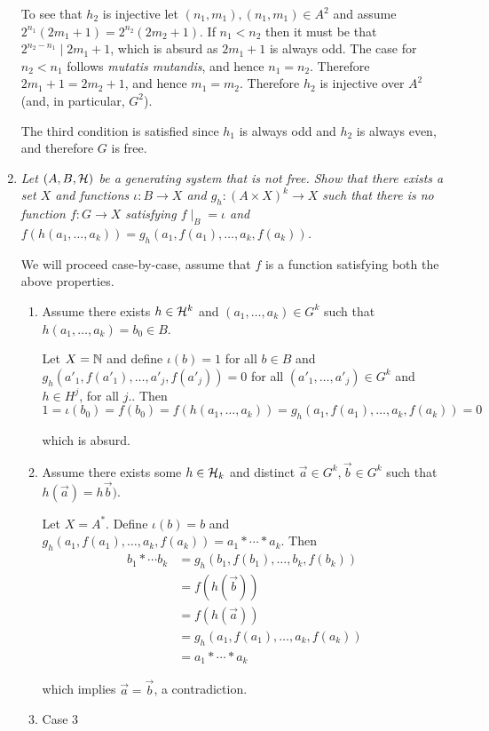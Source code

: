 \documentclass[10pt]{article}
\begin{document}
\begin{enumerate}
To see that $h_2$ is injective let $(n_1, m_1), (n_1, m_1) \in A^2$ and assume $2^{n_1}(2m_1+1) = 2^{n_2}(2m_2+1)$.  If $n_1 < n_2$ then it must be that $2^{n_2-n_1} \mid 2m_1+1$, which is absurd as $2m_1 + 1$ is always odd.  The case for $n_2 < n_1$ follows \emph{mutatis mutandis}, and hence $n_1 = n_2$.  Therefore $2m_1+1 = 2m_2+1$, and hence $m_1=m_2$.  Therefore $h_2$ is injective over $A^2$ (and, in particular, $G^2$).

The third condition is satisfied since $h_1$ is always odd and $h_2$ is always even, and therefore $G$ is free.

\item \emph{Let $(A, B, \cal{H})$ be a generating system that is not free.  Show that there exists a set $X$ and functions $\iota: B \to X$ and $g_h: (A \times X)^k \to X$ such that there is no function $f: G \to X$ satisfying $f \mid_B = \iota$ and $f(h(a_1, \ldots, a_k)) = g_h(a_1, f(a_1), \ldots, a_k, f(a_k))$.}

We will proceed case-by-case, assume that $f$ is a function satisfying both the above properties.

\begin{enumerate}
\item Assume there exists $h \in \cal{H}^k$ and $(a_1, \ldots, a_k) \in G^k$ such that $h(a_1, \ldots, a_k) = b_0 \in B$.

Let $X = \N$ and define $\iota(b) = 1$ for all $b \in B$ and $g_h(a'_1, f(a'_1), \ldots, a'_j, f(a'_j)) = 0$ for all $(a'_1, \ldots, a'_j) \in G^k$ and $h \in H^j$, for all $j$..  Then 
\[
1 = \iota(b_0) = f(b_0) = f(h(a_1, \ldots, a_k)) = g_h(a_1, f(a_1), \ldots, a_k, f(a_k)) = 0
\]

which is absurd.

\item Assume there exists some $h \in \cal{H}_k$ and distinct $\vec{a} \in G^k, \vec{b} \in G^k$ such that $h(\vec{a}) = h\vec{b})$.

Let $X = A^\ast$.  Define $\iota(b) = b$ and $g_h(a_1, f(a_1), \ldots, a_k, f(a_k)) = a_1 \ast \cdots \ast a_k$.  Then
\begin{align*}
b_1 \ast \cdots b_k &= g_h(b_1, f(b_1), \ldots, b_k, f(b_k)) \\
&= f(h(\vec{b}))  \\
&= f(h(\vec{a})) \\
&= g_h(a_1, f(a_1), \ldots, a_k, f(a_k)) \\
&= a_1 \ast \cdots \ast a_k
\end{align*}

which implies $\vec{a} = \vec{b}$, a contradiction.

\item Case 3
\end{enumerate}

\end{enumerate}
\end{document}
